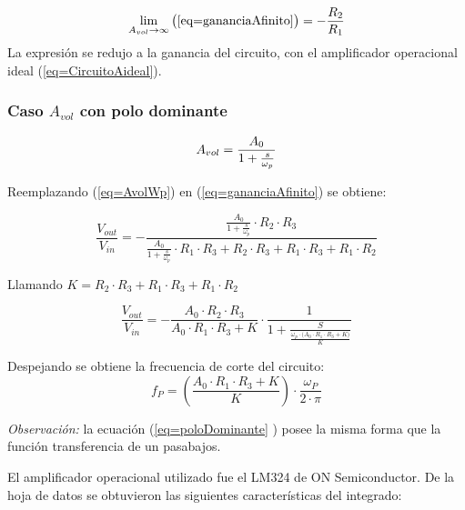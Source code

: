 \documentclass[../../main.tex]{subfiles}
\begin{document}
$$ \lim_{A_{vol}\to\infty} \big( \ref{eq=gananciaAfinito} \big) = -\frac{R_{2}}{R_{1}} $$
La expresi\'on se redujo a la ganancia del circuito, con el amplificador operacional ideal \big(\ref{eq=CircuitoAideal}\big).

\subsubsection{Caso $A_{vol}$  con polo dominante}

\begin{equation}
A_{vol }=\frac{A_{0}}{1+\frac{s}{\omega_{p}}}\label{eq=AvolWp}\\
\end{equation} 

Reemplazando \big(\ref{eq=AvolWp}\big) en  \big(\ref{eq=gananciaAfinito}\big)  se obtiene:

\begin{equation}
\frac{V_{out}}{V_{in}}= - \frac{\frac{A_{0}}{1+\frac{s}{\omega_{p}}} \cdot R_{2} \cdot R_{3}}{\frac{A_{0}}{1+\frac{s}{\omega_{p}}}\cdot R_{1} \cdot R_{3} + R_{2} \cdot R_{3} +  R_{1} \cdot R_{3} + R_{1} \cdot R_{2} }
\end{equation}

Llamando $K= R_{2} \cdot R_{3} +  R_{1} \cdot R_{3} + R_{1} \cdot R_{2}$


\begin{equation}
\frac{V_{out}}{V_{in}}=- \frac{A_{0} \cdot  R_{2} \cdot  R_{3} }{A_{0} \cdot R_{1} \cdot  R_{3} + K }  \cdot \frac{1}{1 +\frac {S}{\frac{\omega_{p}  \cdot \big( A_{0} \cdot R_{1} \cdot R_{3} + K \big) }{K}}} \label{eq=poloDominante}
\end{equation}

 Despejando se obtiene la frecuencia de corte del circuito:
\begin{equation}
f_{P}=\left( \frac {A_{0} \cdot R_{1} \cdot R_{3} + K}{K}\right)  \cdot \frac{\omega_{P}}{2\cdot \pi}  \label{eq=fCorte}
\end{equation}

\textit{Observaci\'on:}  la ecuaci\'on \big(\ref{eq=poloDominante} \big) posee la misma forma que la funci\'on transferencia de un pasabajos.



El amplificador operacional utilizado fue el LM324 de ON Semiconductor. De la hoja de datos se obtuvieron las siguientes características del integrado:
\end{document}
